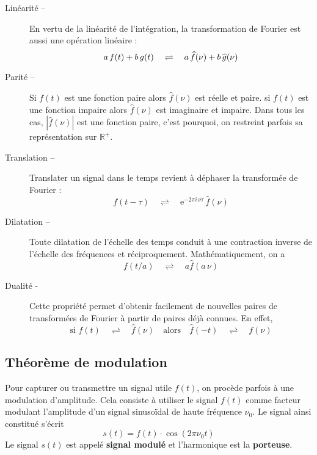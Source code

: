 \begin{description}
	\item[Linéarité --] En vertu de la linéarité de l'intégration, la transformation de Fourier est aussi une opération linéaire :
	\[
	a\,f(t)+b\,g(t)\quad\rightleftharpoons\quad a\,\widehat{f}(\nu)+b\,\widehat{g}(\nu)\\
	\]
	\item[Parité --] Si \(f(t)\) est une fonction paire alors \(\widehat{f}(\nu)\) est réelle et paire. si \(f(t)\) est une fonction impaire alors \(\widehat{f}(\nu)\) est imaginaire et impaire. Dans tous les cas, \(|\widehat{f}(\nu)|\) est une fonction paire, c'est pourquoi, on restreint parfois sa représentation sur \(\mathbb{R}^+\).

	\item[Translation --] Translater un signal dans le temps revient à déphaser la transformée de Fourier :
	\[
		f(t-\tau) \quad\rightleftharpoons \quad \mathrm{e}^{-2\pi i\, \nu \tau}\,\widehat{f}(\nu)
	\]

	\item[Dilatation --] Toute dilatation de l'échelle des temps conduit à une contraction inverse de l'échelle des fréquences et réciproquement. Mathématiquement, on a
	\[
		f(t/a) \quad\rightleftharpoons\quad  a\widehat{f}(a\,\nu)
	\]

	\item[Dualité - ] Cette propriété permet d'obtenir facilement de nouvelles paires de transformées de Fourier à partir de paires déjà connues. En effet,
	\[
		\text{si }f(t) \quad\rightleftharpoons\quad  \widehat{f}(\nu)
		\quad\text{alors}\quad
		\widehat{f}(-t) \quad\rightleftharpoons\quad  f(\nu)
	\]
\end{description}

\subsection{Théorème de modulation} %
\label{sub:theoreme_de_modulation}
Pour capturer ou transmettre un signal utile \(f(t)\), on procède parfois à une modulation d'amplitude. Cela consiste à utiliser le signal \(f(t)\) comme facteur modulant l'amplitude d'un signal sinusoïdal de haute fréquence \(\nu_0\). Le signal ainsi constitué s'écrit
\[
	s(t)=f(t)\cdot \cos(2\pi \nu_0 t)
\]
Le signal \(s(t)\) est appelé \textbf{signal modulé} et l'harmonique est la \textbf{porteuse}.

